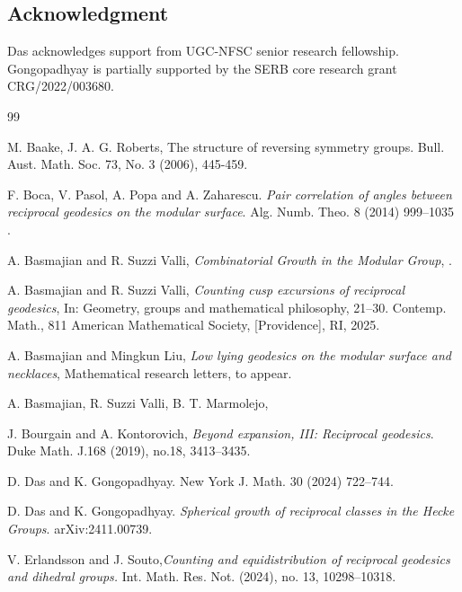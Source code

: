 \documentclass[11pt]{amsart}
\numberwithin{equation}{section}
\numberwithin{equation}{section}
\begin{document}
		\subsection*{Acknowledgment} 
		Das acknowledges support from UGC-NFSC senior research fellowship. Gongopadhyay is partially supported by the SERB core research grant CRG/2022/003680.
		
		
		\begin{thebibliography}{99}

         M. Baake, J. A. G. Roberts,
			\newblock The structure of reversing symmetry groups. 
			\newblock Bull. Aust. Math. Soc.  73, No. 3 (2006),  445-459.
            
 F. Boca, V. Pasol, A. Popa and A. Zaharescu. \emph{Pair correlation of angles between reciprocal geodesics on the modular surface}. 
\newblock Alg. Numb. Theo. 8 (2014) 999–1035 .	
			
			A. Basmajian and R. Suzzi Valli, \emph{Combinatorial Growth in the Modular Group},
			. 

             A. Basmajian and R. Suzzi Valli, \emph{Counting cusp excursions of reciprocal geodesics}, In:  Geometry, groups and mathematical philosophy, 21–30. 
Contemp. Math., 811
American Mathematical Society, [Providence], RI, 2025.

A. Basmajian and Mingkun Liu, \emph{Low lying geodesics on the modular surface and necklaces}, Mathematical
research letters, to appear.

 A. Basmajian, R. Suzzi Valli, B. T. Marmolejo, 
			
			 J. Bourgain and A.  Kontorovich, 
			\emph{Beyond expansion, III: Reciprocal geodesics}.
			Duke Math. J.168 (2019), no.18, 3413–3435.
			
			
			 D. Das and  K. Gongopadhyay.
			\newblock     New York J. Math. 30 (2024) 722–744.

             D. Das and  K. Gongopadhyay.
\newblock \emph{Spherical growth of reciprocal classes in the Hecke Groups}. \newblock arXiv:2411.00739.  
			
			 V. Erlandsson and J. Souto,{\em Counting and equidistribution of reciprocal geodesics and dihedral groups.} \newblock Int. Math. Res. Not.  (2024),  no. 13, 10298–10318.
						

\end{thebibliography}
\end{document}
